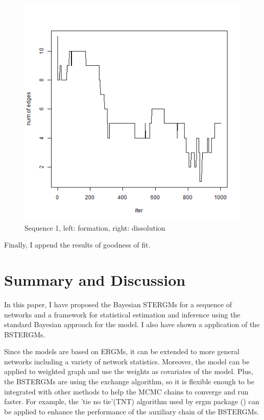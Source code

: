 \documentclass[aspectratio=169,ignorenonframetext,9pt]{beamer}
\theoremstyle{plain}
\theoremstyle{definition}
\begin{document}
\begin{figure}[h]
\begin{center}
        \includegraphics[scale=0.23]{pictures/net3seq_chain1_lastsampler_num_edges.png}
    \caption{Sequence 1, left: formation, right: dissolution}
    \end{center}
\end{figure}
\clearpage


Finally, I append the results of goodness of fit.



\section{Summary and Discussion}
In this paper, I have proposed the Bayesian STERGMs for a sequence of networks
and a framework for statistical estimation and inference using the standard Bayesian approach for the model.
I also have shown a application of the BSTERGMs. %

Since the models are based on ERGMs, it can be extended to more general networks
including a variety of network statistics.
Moreover, the model can be applied to weighted graph and use the weights as covariates of the model.
Plus, the BSTERGMs are using the exchange algorithm, so it is flexible enough to be integrated
with other methods to help the MCMC chains to converge and run faster.
For example, the 'tie no tie'(TNT) algorithm used by ergm package (\cite{RN100}) can be applied to
enhance the performance of the auxiliary chain of the BSTERGMs.
\end{document}
